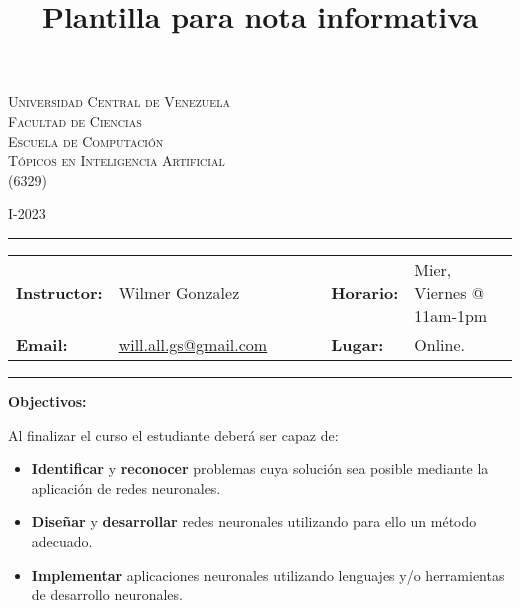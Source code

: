 \documentclass[11pt, a4paper]{article}
\begin{document}
\title{Plantilla para nota informativa}
\begin{center}
{\Large \textsc{Universidad Central de Venezuela \\
Facultad de Ciencias\\ 
Escuela de Computaci\'on\\
T\'opicos en Inteligencia Artificial\\
(6329)}}
\end{center}
\begin{center}
I-2023
\end{center}

\begin{center}
\rule{6in}{0.4pt}
\begin{minipage}[t]{.75\textwidth}
\begin{tabular}{llcccll}
\textbf{Instructor:} & Wilmer Gonzalez & & &  & \textbf{Horario:} & Mier, Viernes @ 11am-1pm \\
\textbf{Email:} &  \href{mailto:wilmer.gonzalez@ciens.ucv.ve}{will.all.gs@gmail.com} & & & & \textbf{Lugar:} & Online. \\
\end{tabular}
\end{minipage}
\rule{6in}{0.4pt}
\end{center}
\vspace{.5cm}
\setlength{\unitlength}{1in}
\renewcommand{\arraystretch}{2}
\renewcommand\refname{\normalsize{Referencias bibliogr\'aficas:}}

\noindent\textbf{Objectivos:}

\vspace{.3cm}
Al finalizar el curso el estudiante deberá ser capaz de:
\begin{itemize}
\item \textbf{Identificar} y \textbf{reconocer} problemas cuya solución sea posible mediante la aplicación de redes neuronales.

\item \textbf{Diseñar} y \textbf{desarrollar} redes neuronales utilizando para ello un método adecuado.

\item \textbf{Implementar} aplicaciones neuronales utilizando lenguajes y/o herramientas de desarrollo neuronales.

\end{itemize}
\end{document}
